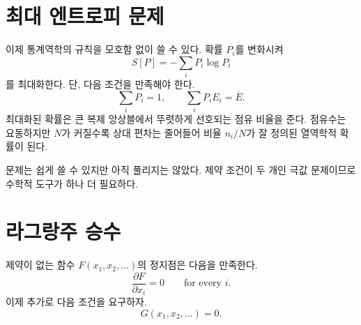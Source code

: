 \begin{classroomqa}\end{classroomqa}

\section{최대 엔트로피 문제}

이제 통계역학의 규칙을 모호함 없이 쓸 수 있다. 확률 \(P_i\)를 변화시켜
\begin{equation}
 S[P]=-\sum_iP_i\log P_i
 \label{eq:sm3-maximize-entropy}
\end{equation}를 최대화한다. 단, 다음 조건을 만족해야 한다.
\begin{equation}
 \sum_iP_i=1,
 \qquad
 \sum_iP_iE_i=\overline E.
 \label{eq:sm3-maxent-constraints}
\end{equation}최대화된 확률은 큰 복제 앙상블에서 뚜렷하게 선호되는 점유 비율을 준다. 점유수는 요동하지만 \(N\)가 커질수록 상대 편차는 줄어들어 비율 \(n_i/N\)가 잘 정의된 열역학적 확률이 된다.

\begin{classroomqa}\end{classroomqa}

문제는 쉽게 쓸 수 있지만 아직 풀리지는 않았다. 제약 조건이 두 개인 극값 문제이므로 수학적 도구가 하나 더 필요하다.

\section{라그랑주 승수}

제약이 없는 함수 \(F(x_1,x_2,\ldots)\)의 정지점은 다음을 만족한다.
\begin{equation}
 \frac{\partial F}{\partial x_i}=0
 \qquad\text{for every }i.
 \label{eq:sm3-unconstrained-stationary}
\end{equation}이제 추가로 다음 조건을 요구하자.
\begin{equation}
 G(x_1,x_2,\ldots)=0.
 \label{eq:sm3-one-constraint}
\end{equation}

